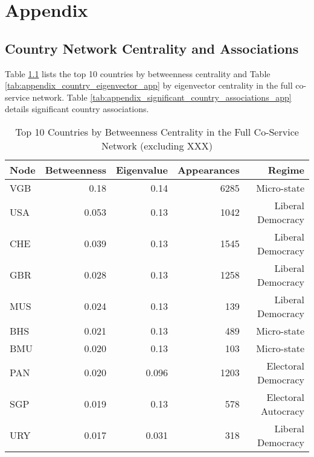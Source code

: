 \chapter{Appendix}
\label{chap:appendix}

\section{Country Network Centrality and Associations}
\label{sec:appendix_country_network}

Table \ref{tab:appendix_country_betweenness_app} lists the top 10 countries by betweenness centrality and Table \ref{tab:appendix_country_eigenvector_app} by eigenvector centrality in the full co-service network. Table \ref{tab:appendix_significant_country_associations_app} details significant country associations.

\begin{table}[htbp]
\centering
\caption{Top 10 Countries by Betweenness Centrality in the Full Co-Service Network (excluding XXX)}
\label{tab:appendix_country_betweenness_app}
\begin{tabular}{lrrrr}
\toprule
Node & Betweenness & Eigenvalue & Appearances & Regime              \\
\midrule
VGB  & 0.18    & 0.14    & 6285        & Micro-state         \\
USA  & 0.053    & 0.13    & 1042        & Liberal Democracy   \\
CHE  & 0.039    & 0.13    & 1545        & Liberal Democracy   \\
GBR  & 0.028    & 0.13    & 1258        & Liberal Democracy   \\
MUS  & 0.024    & 0.13    & 139         & Liberal Democracy   \\
BHS  & 0.021    & 0.13    & 489         & Micro-state         \\
BMU  & 0.020    & 0.13    & 103         & Micro-state         \\
PAN  & 0.020    & 0.096    & 1203        & Electoral Democracy \\
SGP  & 0.019    & 0.13    & 578         & Electoral Autocracy \\
URY  & 0.017    & 0.031    & 318         & Liberal Democracy   \\
\bottomrule
\end{tabular}
\end{table}

